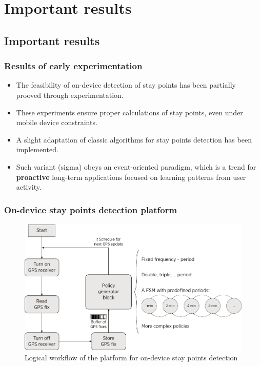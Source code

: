 \documentclass[compress,9pt,xcolor={dvipsnames,table}]{beamer}
\begin{document}
\section{Important results}
\subsection{Important results}
\label{sub:important_results}
\begin{frame}[t]\frametitle{Results of early experimentation}
\begin{itemize}
  \item The feasibility of on-device detection of stay points has been partially prooved through experimentation.
  \item These experiments ensure proper calculations of stay points, even under mobile device constraints.
  \item A slight adaptation of classic algorithms for stay points detection has been implemented.
  \item Such variant (sigma) obeys an event-oriented paradigm, which is a trend for \textbf{proactive} long-term applications focused on learning patterns from user activity.
\end{itemize}
\end{frame}

\begin{frame}[t]\frametitle{On-device stay points detection platform}
    
\begin{figure}[tb]
  \centering
  \includegraphics[scale=0.5]{../../../resources/images/vectors/policy-creator-methodology}
  \caption{Logical workflow of the platform for on-device stay points detection}
  \label{fig:logical-workflow}
\end{figure}

\end{frame}
\end{document}
